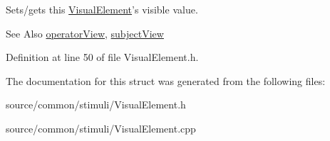Sets/gets this \hyperlink{struct_picto_1_1_visual_element}{Visual\-Element}'s visible value. 

\begin{DoxySeeAlso}{See Also}
\hyperlink{struct_picto_1_1_visual_element_a963d35c5bd3582ac5f5309332f743a86}{operator\-View}, \hyperlink{struct_picto_1_1_visual_element_a9e7880f1536bbc1fbf4703bc23e92cee}{subject\-View} 
\end{DoxySeeAlso}


Definition at line 50 of file Visual\-Element.\-h.



The documentation for this struct was generated from the following files\-:\begin{DoxyCompactItemize}
\item 
source/common/stimuli/Visual\-Element.\-h\item 
source/common/stimuli/Visual\-Element.\-cpp\end{DoxyCompactItemize}
